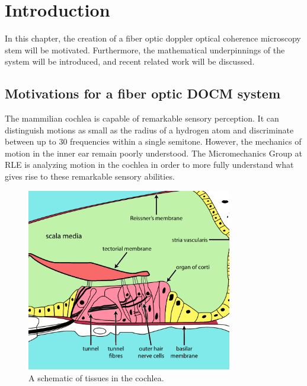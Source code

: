 \chapter{Introduction}

In this chapter, the creation of a fiber optic doppler optical coherence microscopy stem will be motivated. Furthermore, the mathematical underpinnings of the system will be introduced, and recent related work will be discussed.

\section{Motivations for a fiber optic DOCM system}

\label{sec:intro}

The mammilian cochlea is capable of remarkable sensory perception. It can distinguish motions as small as the radius of a hydrogen atom and discriminate between up to 30 frequencies within a single semitone. \cite{ghafarri} However, the mechanics of motion in the inner ear remain poorly understood. The Micromechanics Group at RLE is  analyzing motion in the cochlea in order to more fully understand what gives rise to these remarkable sensory abilities.

\begin{figure}[h!]
  \centering
    \includegraphics[width=0.8\textwidth]{Images/Background/cochlea.png}
      \caption{A schematic of tissues in the cochlea.}
      \label{fig:cochlea}
\end{figure}

